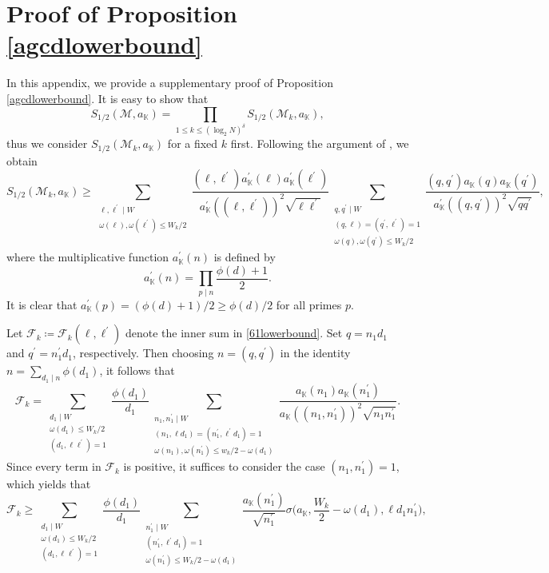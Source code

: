 \documentclass[12pt,reqno]{amsart}
\theoremstyle{definition}
\numberwithin{equation}{section}
\newcommand{\mbk}{\mathbb{K}}
\newcommand{\mcf}{\mathcal{F}}
\newcommand{\mcm}{\mathcal{M}}
\begin{document}
\section{Proof of Proposition \ref{agcdlowerbound}}
In this appendix, we provide a supplementary proof of Proposition \ref{agcdlowerbound}. It is easy to show that 
\begin{equation}
    \label{smakprod}
    S_{1/2}(\mcm,a_\mbk) = \prod_{1 \le k \le (\log_2 N)^\delta}S_{1/2}(\mcm_k,a_\mbk),
\end{equation}
thus we consider $S_{1/2}(\mcm_k,a_\mbk)$ for a fixed $k$ first. Following the argument of \cite[Lemma 2]{fonga2023extreme}, we obtain 
\begin{equation}
\label{61lowerbound}
    S_{1/2}(\mcm_k,a_\mbk) \ge \sum_{\substack{\ell,\ell^\prime \mid W\\ \omega(\ell),\omega(\ell^\prime)\le W_k/2}} \frac{(\ell,\ell^\prime)a_\mbk^\prime(\ell)a_\mbk^\prime(\ell^\prime)}{a_\mbk^\prime((\ell,\ell^\prime))^2\sqrt{\ell\ell^\prime}} \sum_{\substack{q,q^\prime \mid W \\ (q,\ell)=(q^\prime,\ell^\prime)=1 \\\omega(q),\omega(q^\prime)\le W_k/2}}\frac{(q,q^\prime)a_\mbk(q)a_\mbk(q^\prime)}{a_\mbk^\prime((q,q^\prime))^2\sqrt{qq^\prime}},
\end{equation}
where the multiplicative function $a_\mbk^\prime(n)$ is defined by
$$
a_\mbk^\prime(n) = \prod_{p \mid n}\frac{\phi(d)+1}{2}.
$$
It is clear that $a_\mbk^\prime(p) = (\phi(d)+1)/2 \ge \phi(d)/2$ for all primes $p$.
\par
Let $\mcf_k \coloneqq \mcf_k(\ell,\ell^\prime)$ denote the inner sum in \eqref{61lowerbound}. Set $q=n_1d_1$ and $q^\prime=n_1^\prime d_1$, respectively. Then choosing $n=(q,q^\prime)$ in the identity $n=\sum_{d_1 \mid n}\phi(d_1)$, it follows that 
$$
\mcf_k =\sum_{\substack{d_1 \mid W \\ \omega(d_1) \leq W_k / 2 \\(d_1, \ell \ell^{\prime})=1}} \frac{\phi(d_1)}{d_1} \sum_{\substack{n_1, n_1^{\prime} \mid W \\(n_1, \ell d_1)=(n_1^{\prime}, \ell^{\prime} d_1)=1 \\ \omega(n_1), \omega(n_1^{\prime}) \leqslant w_k / 2-\omega(d_1)}} \frac{a_\mbk(n_1) a_\mbk(n_1^{\prime})}{a_\mbk((n_1, n_1^{\prime}))^2 \sqrt{n_1 n_1^{\prime}}}.
$$
Since every term in $\mcf_k$ is positive, it suffices to consider the case $(n_1,n_1^\prime)=1$, which yields that
$$
\mcf_k \ge  \sum_{\substack{d_1 \mid W \\
\omega(d_1) \leq W_k / 2 \\
(d_1, \ell \ell^{\prime})=1}} \frac{\phi(d_1)}{d_1}\sum_{\substack{n_1^{\prime} \mid W \\
(n_1^{\prime}, \ell^{\prime} d_1)=1 \\
\omega(n_1^{\prime}) \leq W_k / 2-\omega(d_1)}} \frac{a_\mbk(n_1^{\prime})}{\sqrt{n_1^{\prime}}} \sigma\Big(a_\mbk, \frac{W_k}{2}-\omega(d_1), \ell d_1 n_1^{\prime}\Big),
$$
\end{document}
